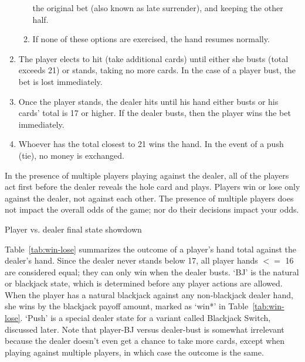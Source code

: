 \begin{enumerate}
\begin{enumerate}
the original bet (also known as late surrender), and keeping the other half.
\item If none of these options are exercised, the hand resumes normally.
\end{enumerate}
\item The player elects to hit (take additional cards) until either
she busts (total exceeds 21) or stands, taking no more cards.
In the case of a player bust, the bet is lost immediately.
\item Once the player stands, the dealer hits until his hand either busts
or his cards' total is 17 or higher.  
If the dealer busts, then the player wins the bet immediately.  
\item Whoever has the total closest to 21 wins the hand.
In the event of a push (tie), no money is exchanged.
\end{enumerate}


In the presence of multiple players playing against the dealer, 
all of the players act first before the dealer reveals the hole card
and plays.  
Players win or lose only against the dealer, not against each other.
The presence of multiple players does not impact the overall 
odds of the game; nor do their decisions impact your odds.

\begin{table}[ht!]
\caption{Player vs. dealer final state showdown}
\begin{center}

\end{center}
\label{tab:win-lose}
\end{table}

Table~\ref{tab:win-lose} summarizes the outcome of a player's hand total
against the dealer's hand.
Since the dealer never stands below 17, all player hands $<=$ 16
are considered equal; they can only win when the dealer busts.
`BJ' is the natural or blackjack state, which is determined 
before any player actions are allowed.
When the player has a natural blackjack against any non-blackjack 
dealer hand, she wins by the blackjack payoff amount, marked as `win*'
in Table~\ref{tab:win-lose}.  
`Push' is a special dealer state for a variant called Blackjack Switch, 
discussed later.
Note that player-BJ versus dealer-bust is somewhat irrelevant because
the dealer doesn't even get a chance to take more cards, 
except when playing against multiple players, 
in which case the outcome is the same.  


